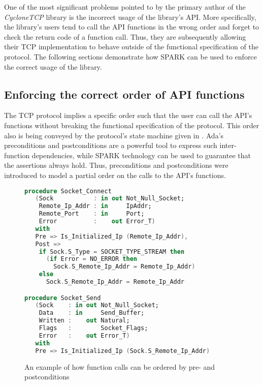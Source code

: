 \documentclass[conference]{IEEEtran}
\begin{document}
One of the most significant problems pointed to by the primary author of the \emph{CycloneTCP} library is the incorrect usage of the library's API. More specifically, the library's users tend to call the API functions in the wrong order and forget to check the return code of a function call. Thus, they are subsequently allowing their  TCP implementation to behave outside of the functional specification of the protocol. The following sections demonstrate how SPARK can be used to enforce the correct usage of the library.


\subsection{Enforcing the correct order of API functions}

The TCP protocol implies a specific order such that the user can call the API's
functions without breaking the functional specification of the protocol. This
order also is being conveyed by the protocol's state machine given in
.
Ada's preconditions and postconditions are a powerful tool to express such inter-function
dependencies, while SPARK technology can be used to guarantee that the
assertions always hold. Thus, preconditions and postconditions were introduced to model
a partial order on the calls to the API's functions.

\begin{figure}
\begin{lstlisting}[language=Ada,basicstyle=\footnotesize\ttfamily]
procedure Socket_Connect
   (Sock           : in out Not_Null_Socket;
    Remote_Ip_Addr : in     IpAddr;
    Remote_Port    : in     Port;
    Error          :    out Error_T)
   with
   Pre => Is_Initialized_Ip (Remote_Ip_Addr),
   Post =>
    if Sock.S_Type = SOCKET_TYPE_STREAM then
      (if Error = NO_ERROR then
        Sock.S_Remote_Ip_Addr = Remote_Ip_Addr)
    else
      Sock.S_Remote_Ip_Addr = Remote_Ip_Addr

procedure Socket_Send
   (Sock    : in out Not_Null_Socket;
    Data    : in     Send_Buffer;
    Written :    out Natural;
    Flags   :        Socket_Flags;
    Error   :    out Error_T)
   with
   Pre => Is_Initialized_Ip (Sock.S_Remote_Ip_Addr)
\end{lstlisting}
\caption{An example of how function calls can be ordered by pre- and
postconditions}
\label{fig:functionorder}
\end{figure}
\end{document}

